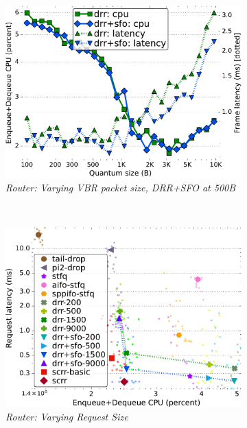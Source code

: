 \begin{figure}[th!]
\begin{subfigure}[t]{.30\linewidth}
    \includegraphics[width=0.95\linewidth]{figs/burst_cn_2t4x16_mn_2ui32_css_500_bbr3_kp_lat_drr_basic_fq_drr.pdf}
    \caption{\small{\textit{Router: Varying VBR packet size, DRR+SFO at 500B}}}
    \label{fig:vbr-bbr3-drr-full}
  \end{subfigure}
  \\
  \begin{subfigure}[t]{.30\linewidth}
    \centering
    \includegraphics[width=0.95\linewidth]{figs/pkt_size_cn_2t4x16_mn_2tb2x4_bbr3_kp_lat_comp_methods.pdf}
    \caption{\small{\textit{Router: Varying Request Size}}}
    \label{fig:request-bbr3-cpu-latency-full}
  \end{subfigure}
  \begin{subfigure}[t]{.30\linewidth}
    \centering

\end{subfigure}
\end{figure}
